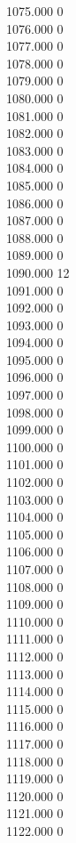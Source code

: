 { 1075.000	0 \\
 1076.000	0 \\
 1077.000	0 \\
 1078.000	0 \\
 1079.000	0 \\
 1080.000	0 \\
 1081.000	0 \\
 1082.000	0 \\
 1083.000	0 \\
 1084.000	0 \\
 1085.000	0 \\
 1086.000	0 \\
 1087.000	0 \\
 1088.000	0 \\
 1089.000	0 \\
 1090.000	12 \\
 1091.000	0 \\
 1092.000	0 \\
 1093.000	0 \\
 1094.000	0 \\
 1095.000	0 \\
 1096.000	0 \\
 1097.000	0 \\
 1098.000	0 \\
 1099.000	0 \\
 1100.000	0 \\
 1101.000	0 \\
 1102.000	0 \\
 1103.000	0 \\
 1104.000	0 \\
 1105.000	0 \\
 1106.000	0 \\
 1107.000	0 \\
 1108.000	0 \\
 1109.000	0 \\
 1110.000	0 \\
 1111.000	0 \\
 1112.000	0 \\
 1113.000	0 \\
 1114.000	0 \\
 1115.000	0 \\
 1116.000	0 \\
 1117.000	0 \\
 1118.000	0 \\
 1119.000	0 \\
 1120.000	0 \\
 1121.000	0 \\
 1122.000	0 \\
}

